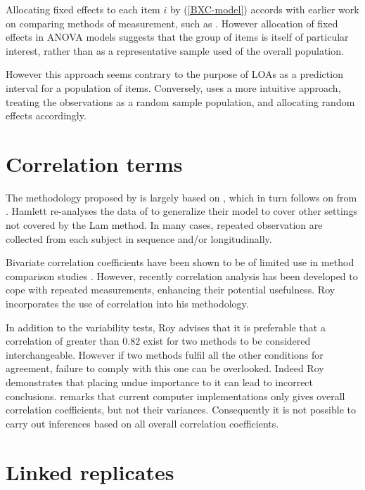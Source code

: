 \documentclass[12pt, a4paper]{report}
\theoremstyle{plain}
\theoremstyle{definition}
\theoremstyle{remark}
\begin{document}
Allocating fixed effects to each item $i$ by (\ref{BXC-model}) accords with earlier work on comparing methods of measurement, such as \citet{Grubbs48}. However allocation of fixed effects in ANOVA models suggests that the group of items is itself of particular interest, rather than as a representative sample used of the overall population. 

However this approach seems contrary to the purpose of LOAs as a prediction interval for a population of items. Conversely, \citet{roy}
uses a more intuitive approach, treating the observations as a random sample population, and allocating random effects accordingly.






\section{Correlation terms}
The methodology proposed by \citet{ARoy2009} is largely based on \citet{hamlett}, which in turn follows on from \citet{lam}. Hamlett re-analyses the data of \citet{lam} to generalize their model to cover other settings not covered by the Lam method. In many cases, repeated observation are collected from each subject in sequence  and/or longitudinally.


Bivariate correlation coefficients have been shown to be of
limited use in method comparison studies \citep{BA86}. However,
recently correlation analysis has been developed to cope with
repeated measurements, enhancing their potential usefulness. Roy
incorporates the use of correlation into his methodology.


In addition to the variability tests, Roy advises that it is preferable that a correlation of greater than $0.82$ exist for two methods to be considered interchangeable. However if two methods fulfil all the other conditions for agreement, failure to comply with this one can be overlooked. Indeed Roy demonstrates that placing undue importance to it can lead to incorrect conclusions. \citet{ARoy2009} remarks that current computer implementations only gives overall correlation coefficients, but not their variances. Consequently it is not possible to carry out inferences based on all overall correlation coefficients.


	
	\section{Linked replicates}
	
\end{document}
